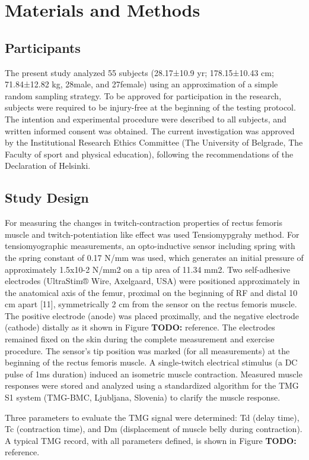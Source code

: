 \documentclass[utf8]{style/FrontiersinHarvard}
\newcommand{\TODO}[1]{{\textbf{TODO:} {\color{red} #1}}}
\begin{document}
\section{Materials and Methods}
\subsection{Participants}
The present study analyzed 55 subjects (28.17±10.9 yr; 178.15±10.43 cm; 71.84±12.82 kg, 28male, and 27female) using an approximation of a simple random sampling strategy.
To be approved for participation in the research, subjects were required to be injury-free at the beginning of the testing protocol.
The intention and experimental procedure were described to all subjects, and written informed consent was obtained.
The current investigation was approved by the Institutional Research Ethics Committee (The University of Belgrade, The Faculty of sport and physical education), following the recommendations of the Declaration of Helsinki.

\subsection{Study Design}
For measuring the changes in twitch-contraction properties of rectus femoris muscle and twitch-potentiation like effect was used Tensiomypgrahy method.
For tensiomyographic measurements, an opto-inductive sensor including spring with the spring constant of 0.17 N/mm was used, which generates an initial pressure of approximately 1.5x10-2 N/mm2 on a tip area of 11.34 mm2.
Two self-adhesive electrodes (UltraStim® Wire, Axelgaard, USA) were positioned approximately in the anatomical axis of the femur, proximal on the beginning of RF and distal 10 cm apart [11], symmetrically 2 cm from the sensor on the rectus femoris muscle.
The positive electrode (anode) was placed proximally, and the negative electrode (cathode) distally as it shown in Figure \TODO{reference}.
The electrodes remained fixed on the skin during the complete measurement and exercise procedure.
The sensor's tip position was marked (for all measurements) at the beginning of the rectus femoris muscle.
A single-twitch electrical stimulus (a DC pulse of 1ms duration) induced an isometric muscle contraction.
Measured muscle responses were stored and analyzed using a standardized algorithm for the TMG S1 system (TMG-BMC, Ljubljana, Slovenia) to clarify the muscle response.

Three parameters to evaluate the TMG signal were determined: Td (delay time), Tc (contraction time), and Dm (displacement of muscle belly during contraction).
A typical TMG record, with all parameters defined, is shown in Figure \TODO{reference}.
\end{document}
